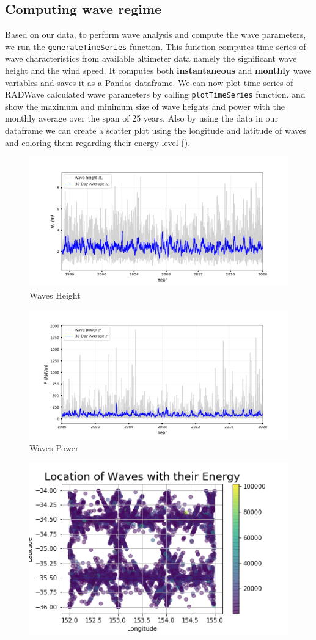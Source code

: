 \documentclass[12pt]{article}
\begin{document}
\subsection{Computing wave regime}
Based on our data, to perform wave analysis and compute the wave parameters, we run the \texttt{generateTimeSeries} function. This function computes time series of wave characteristics from available altimeter data namely the significant wave height and the wind speed. It computes both \textbf{instantaneous} and \textbf{monthly} wave variables and saves it as a Pandas dataframe. We can now plot time series of RADWave calculated wave parameters by calling \texttt{plotTimeSeries} function.
 and  show the maximum and minimum size of wave heights and power with the monthly average over the span of 25 years. Also by using the data in our dataframe we can create a scatter plot using the longitude and latitude of waves and coloring them regarding their energy level ().
\newpage

\begin{figure}[h]
    \centering
    \includegraphics[width=12 cm]{Hseries.png}
    \caption{Waves Height}
    \label{fig:fig2}
\end{figure}

\begin{figure}[h]
    \centering
    \includegraphics[width=12 cm]{Pseries.png}
    \caption{Waves Power}
    \label{fig:fig3}
\end{figure}

\begin{figure}[h]
    \centering
    \includegraphics[width=8 cm]{wave_location.png}
    \caption{}
    \label{fig:fig4}
\end{figure}

\newpage
\end{document}
